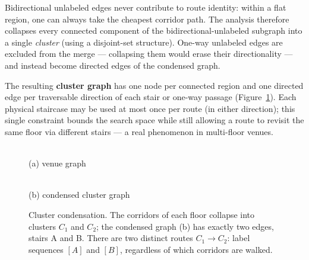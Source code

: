 \documentclass[11pt,a4paper,twocolumn]{article}
\begin{document}
Bidirectional unlabeled edges never contribute to route
identity: within a flat region, one can always take the cheapest corridor
path. The analysis therefore collapses every connected component of the
bidirectional-unlabeled subgraph into a single \emph{cluster} (using a
disjoint-set structure). One-way unlabeled edges are excluded from the merge
--- collapsing them would erase their directionality --- and instead become
directed edges of the condensed graph.

The resulting \textbf{cluster graph} has one node per connected region and one
directed edge per traversable direction of each stair or one-way passage
(Figure~\ref{fig:clusters}). Each physical staircase may be used at most once
per route (in either direction); this single constraint bounds the search
space while still allowing a route to revisit the same floor via
different stairs --- a real phenomenon in multi-floor venues.

\begin{figure}[h]
\centering
{}\\[3pt]
\footnotesize (a) venue graph
\\[10pt]
\\[3pt]
\footnotesize (b) condensed cluster graph
\caption{Cluster condensation. The corridors of each floor collapse into
clusters $C_1$ and $C_2$; the condensed graph (b) has exactly two edges,
stairs A and B. There are two distinct routes $C_1 \to C_2$: label sequences
$[A]$ and $[B]$, regardless of which corridors are walked.}
\label{fig:clusters}
\end{figure}
\end{document}
